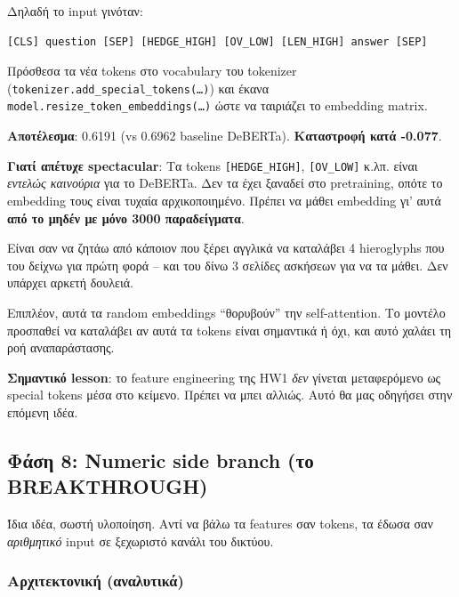 \documentclass[12pt]{fphw}
\begin{document}
Δηλαδή το input γινόταν:
\begin{verbatim}
[CLS] question [SEP] [HEDGE_HIGH] [OV_LOW] [LEN_HIGH] answer [SEP]
\end{verbatim}

Πρόσθεσα τα νέα tokens στο vocabulary του tokenizer (\texttt{tokenizer.add\_special\_tokens(\dots)}) και έκανα \texttt{model.resize\_token\_embeddings(\dots)} ώστε να ταιριάζει το embedding matrix.

\textbf{Αποτέλεσμα}: 0.6191 (vs 0.6962 baseline DeBERTa). \textbf{Καταστροφή κατά -0.077}.

\textbf{Γιατί απέτυχε spectacular}: Τα tokens \texttt{[HEDGE\_HIGH]}, \texttt{[OV\_LOW]} κ.λπ. είναι \emph{εντελώς καινούρια} για το DeBERTa. Δεν τα έχει ξαναδεί στο pretraining, οπότε το embedding τους είναι τυχαία αρχικοποιημένο. Πρέπει να μάθει embedding γι' αυτά \textbf{από το μηδέν με μόνο 3000 παραδείγματα}.

Είναι σαν να ζητάω από κάποιον που ξέρει αγγλικά να καταλάβει 4 hieroglyphs που του δείχνω για πρώτη φορά -- και του δίνω 3 σελίδες ασκήσεων για να τα μάθει. Δεν υπάρχει αρκετή δουλειά.

Επιπλέον, αυτά τα random embeddings ``θορυβούν'' την self-attention. Το μοντέλο προσπαθεί να καταλάβει αν αυτά τα tokens είναι σημαντικά ή όχι, και αυτό χαλάει τη ροή αναπαράστασης.

\textbf{Σημαντικό lesson}: το feature engineering της HW1 \emph{δεν} γίνεται μεταφερόμενο ως special tokens μέσα στο κείμενο. Πρέπει να μπει αλλιώς. Αυτό θα μας οδηγήσει στην επόμενη ιδέα.

\subsection{Φάση 8: Numeric side branch (το BREAKTHROUGH)}

Ίδια ιδέα, σωστή υλοποίηση. Αντί να βάλω τα features σαν tokens, τα έδωσα σαν \emph{αριθμητικό} input σε ξεχωριστό κανάλι του δικτύου.

\subsubsection{Αρχιτεκτονική (αναλυτικά)}
\end{document}
